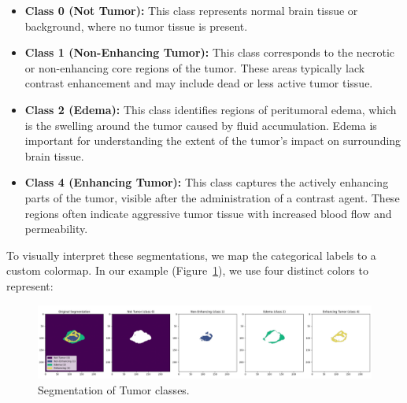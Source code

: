\begin{itemize}
  \item \textbf{Class 0 (Not Tumor):} This class represents normal brain tissue or background, where no tumor tissue is present.
  \item \textbf{Class 1 (Non-Enhancing Tumor):} This class corresponds to the necrotic or non-enhancing core regions of the tumor. These areas typically lack contrast enhancement and may include dead or less active tumor tissue.
  \item \textbf{Class 2 (Edema):} This class identifies regions of peritumoral edema, which is the swelling around the tumor caused by fluid accumulation. Edema is important for understanding the extent of the tumor’s impact on surrounding brain tissue.
  \item \textbf{Class 4 (Enhancing Tumor):} This class captures the actively enhancing parts of the tumor, visible after the administration of a contrast agent. These regions often indicate aggressive tumor tissue with increased blood flow and permeability.
\end{itemize}

To visually interpret these segmentations, we map the categorical labels to a custom colormap. In our example (Figure~\ref{fig:tclass}), we use four distinct colors to represent:

\begin{figure}[H]
  \centering
  \includegraphics[width=1.1\textwidth]{Images/Chapter3/tclass.png}
  \caption{Segmentation of Tumor classes.}
  \label{fig:tclass}
\end{figure}

